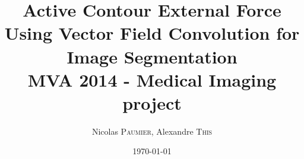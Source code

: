\documentclass{article}
\title{Active Contour External Force Using Vector
Field Convolution for Image Segmentation \\MVA 2014 - Medical Imaging project} %
\author{Nicolas \textsc{Paumier}, Alexandre \textsc{This}} %
\date{\today} %
\begin{document}
\maketitle %



\setlength\parindent{0pt} %

\renewcommand{\labelenumi}{\alph{enumi}.} %

\tableofcontents

\newpage




\appendix

\newpage


\end{document}
